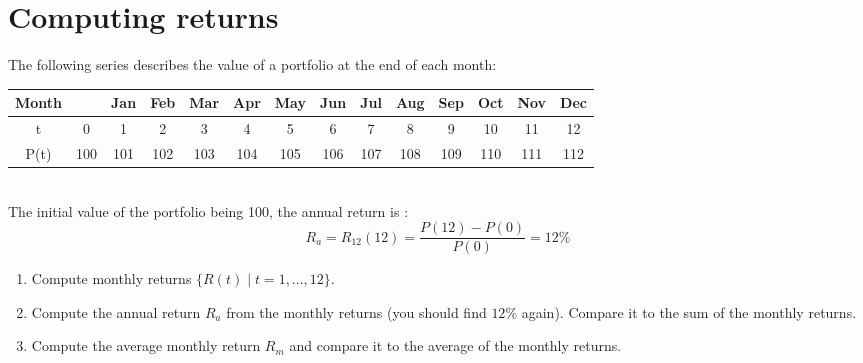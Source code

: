 \section{Computing returns}
The following series describes the value of a portfolio at the end of each month:\\
\begin{tabular}{|c|ccccccccccccc|}
\hline
Month &    & Jan & Feb & Mar & Apr & May & Jun & Jul & Aug & Sep & Oct & Nov & Dec \\ 
\hline
t     & 0 & 1 & 2 & 3 & 4 & 5 & 6 & 7 & 8 & 9 & 10 & 11 & 12 \\
\hline
P(t)  & 100 & 101 & 102 & 103 & 104 & 105 & 106 & 107 & 108 & 109 & 110 & 111 & 112 \\
\hline
\end{tabular}
\\

\noindent The initial value of the portfolio being 100, the annual return is : $$R_a = R_{12}(12) = \frac{P(12) - P(0)}{P(0)} = 12\%$$

\begin{enumerate}
    \item Compute monthly returns $\{R(t) \mid t = 1,...,12\}$.
    \item Compute the annual return $R_a$ from the monthly returns (you should find $12\%$ again). Compare it to the sum of the monthly returns.  
    \item Compute the average monthly return $R_m$ and compare it to the average of the monthly returns.
\end{enumerate}